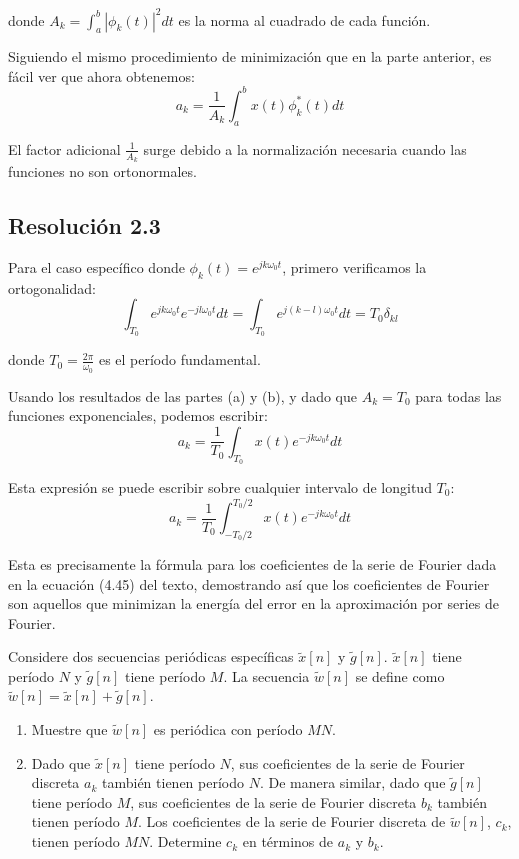 \documentclass[
  11pt,
  letterpaper,
   addpoints,
   answers
  ]{exam}
\begin{document}
\begin{questions}
\begin{solution}
donde $A_k = \int_a^b |\phi_k(t)|^2 dt$ es la norma al cuadrado de cada función.

Siguiendo el mismo procedimiento de minimización que en la parte anterior, es fácil ver que ahora obtenemos:
$$\boxed{a_k = \frac{1}{A_k} \int_a^b x(t)\phi_k^*(t) dt}$$

El factor adicional $\frac{1}{A_k}$ surge debido a la normalización necesaria cuando las funciones no son ortonormales.

\subsection*{Resolución 2.3}
Para el caso específico donde $\phi_k(t) = e^{jk\omega_0 t}$, primero verificamos la ortogonalidad:
$$\int_{T_0} e^{jk\omega_0 t} e^{-jl\omega_0 t} dt = \int_{T_0} e^{j(k-l)\omega_0 t} dt = T_0 \delta_{kl}$$

donde $T_0 = \frac{2\pi}{\omega_0}$ es el período fundamental.

Usando los resultados de las partes (a) y (b), y dado que $A_k = T_0$ para todas las funciones exponenciales, podemos escribir:
$$a_k = \frac{1}{T_0} \int_{T_0} x(t)e^{-jk\omega_0 t} dt$$

Esta expresión se puede escribir sobre cualquier intervalo de longitud $T_0$:
$$\boxed{a_k = \frac{1}{T_0} \int_{-T_0/2}^{T_0/2} x(t)e^{-jk\omega_0 t} dt}$$

Esta es precisamente la fórmula para los coeficientes de la serie de Fourier dada en la ecuación (4.45) del texto, demostrando así que los coeficientes de Fourier son aquellos que minimizan la energía del error en la aproximación por series de Fourier.
\end{solution}
\question 
Considere dos secuencias periódicas específicas $\tilde{x}[n]$ y $\tilde{g}[n]$. $\tilde{x}[n]$ tiene período $N$ y $\tilde{g}[n]$ tiene período $M$. La secuencia $\tilde{w}[n]$ se define como $\tilde{w}[n] = \tilde{x}[n] + \tilde{g}[n]$.

\begin{enumerate}
\item Muestre que $\tilde{w}[n]$ es periódica con período $MN$.

\item Dado que $\tilde{x}[n]$ tiene período $N$, sus coeficientes de la serie de Fourier discreta $a_k$ también tienen período $N$. De manera similar, dado que $\tilde{g}[n]$ tiene período $M$, sus coeficientes de la serie de Fourier discreta $b_k$ también tienen período $M$. Los coeficientes de la serie de Fourier discreta de $\tilde{w}[n]$, $c_k$, tienen período $MN$. Determine $c_k$ en términos de $a_k$ y $b_k$.
\end{enumerate}


\end{questions}
\end{document}

